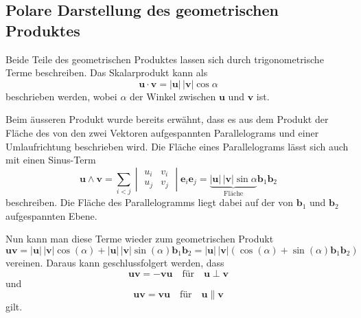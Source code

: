 \subsection{Polare Darstellung des geometrischen Produktes}
%
Beide Teile des geometrischen Produktes lassen sich durch trigonometrische Terme beschreiben.
Das Skalarprodukt kann als 
\begin{equation*}
    \textbf{u}\cdot \textbf{v} = |\textbf{u}|\,|\textbf{v}|\cos{\alpha}
\end{equation*}
beschrieben werden, wobei $\alpha$ der Winkel zwischen $\textbf{u}$ und $\textbf{v}$ ist.

Beim äusseren Produkt wurde bereits erwähnt, dass es aus dem Produkt der Fläche des von den zwei Vektoren aufgespannten Parallelograms und einer Umlaufrichtung beschrieben wird.
Die Fläche eines Parallelograms lässt sich auch mit einen Sinus-Term
\begin{equation*}
    \textbf{u} \wedge \textbf{v}
    = 
    \sum_{i<j}
    \begin{vmatrix} 
        u_i & v_i \\
        u_j & v_j
    \end{vmatrix}\textbf{e}_i\textbf{e}_j  
    = 
    \underbrace{|\textbf{u}|\,|\textbf{v}|\sin{\alpha}}_{\text{Fläche}}\textbf{b}_1\textbf{b}_2
\end{equation*}
beschreiben.
Die Fläche des Parallelogramms liegt dabei auf der von $\textbf{b}_1$ und $\textbf{b}_2$ aufgespannten Ebene.

Nun kann man diese Terme wieder zum geometrischen Produkt
\begin{equation*}
    \textbf{u}\textbf{v}
    = 
    |\textbf{u}|\,|\textbf{v}|\cos{(\alpha)} 
    + 
    |\textbf{u}|\,|\textbf{v}|\sin{(\alpha)} \textbf{b}_1\textbf{b}_2
    = 
    |\textbf{u}|\,|\textbf{v}|(\cos{(\alpha)} + \sin{(\alpha)}\textbf{b}_1\textbf{b}_2)
\end{equation*}
vereinen.
Daraus kann geschlussfolgert werden, dass
\begin{equation}
	\textbf{u} \textbf{v}=-\textbf{v}\textbf{u} \quad \textrm{für} \quad \textbf{u}\perp \textbf{v} 
	\label{uperpv}
\end{equation}
und
\begin{equation}
	\textbf{u} \textbf{v}=\textbf{v}\textbf{u} \quad \textrm{für} \quad \textbf{u} \parallel \textbf{v} 
	\label{uparallelv}
\end{equation}
gilt.
